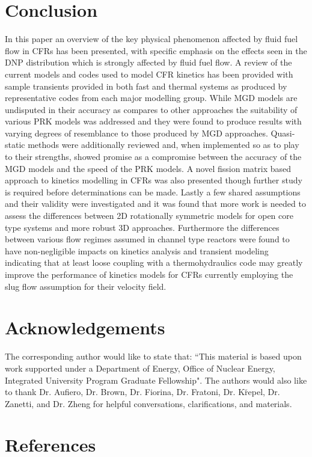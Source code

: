 \documentclass[review]{elsarticle}
\begin{document}
\section{Conclusion} \label{sec:conc}
In this paper an overview of the key physical phenomenon affected by fluid fuel
flow in CFRs has been presented, with specific emphasis on the effects seen
in the DNP distribution which is strongly affected by fluid fuel flow.
A review of the current models and codes used to
model CFR kinetics has been provided with sample transients provided in both
fast and thermal systems as produced by representative codes from each major
modelling group. While MGD models are undisputed in their accuracy as compares
to other approaches the suitability of various PRK models was addressed
and they were found to produce results with varying degrees of resemblance to
those produced by MGD approaches. Quasi-static methods were additionally
reviewed and, when implemented so as to play to their strengths, showed promise
as a compromise between the accuracy of the MGD models and the speed of the PRK
models. A novel fission matrix based approach to kinetics modelling in CFRs was
also presented though further study is required before determinations can be
made. Lastly a few shared assumptions and their validity were investigated and
it was found that more work is needed to assess the differences between 2D 
rotationally symmetric models for open core type systems and more robust 3D
approaches. Furthermore the differences between various flow regimes assumed
in channel type reactors were found to have non-negligible impacts on kinetics
analysis and transient modeling indicating that at least loose coupling with
a thermohydraulics code may greatly improve the performance of kinetics models
for CFRs currently employing the slug flow assumption for their velocity field.

\section{Acknowledgements} \label{sec:ack}
The corresponding author would like to state that: ``This material is based
upon work supported under a Department of Energy, Office of Nuclear Energy,
Integrated University Program Graduate Fellowship". The authors would also
like to thank Dr. Aufiero, Dr. Brown, Dr. Fiorina, Dr. Fratoni, 
Dr. K{\u r}epel, 
Dr. Zanetti, and Dr. Zheng for helpful conversations, clarifications, and
materials.  

\section*{References}
\end{document}
